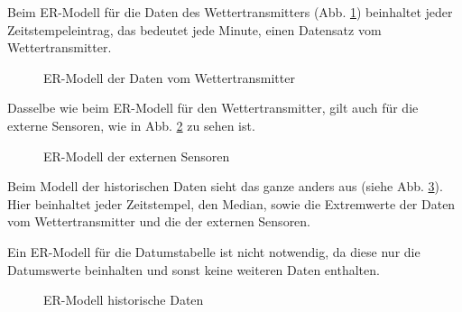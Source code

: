 Beim ER-Modell für die Daten des Wettertransmitters (Abb. \ref{img:ER_Modell Wettertransmitter}) beinhaltet jeder Zeitstempeleintrag, das bedeutet jede Minute, einen Datensatz vom Wettertransmitter.

\begin{figure}[h!]
	\centering
	\caption{ER-Modell der Daten vom Wettertransmitter}
	\label{img:ER_Modell Wettertransmitter}
\end{figure}

Dasselbe wie beim ER-Modell für den Wettertransmitter, gilt auch für die externe Sensoren, wie in Abb. \ref{img:ER_Modell externe Sensoren} zu sehen ist.
\begin{figure}[h!]
	\centering
	\caption{ER-Modell der externen Sensoren}
	\label{img:ER_Modell externe Sensoren}
\end{figure}

Beim Modell der historischen Daten sieht das ganze anders aus (siehe Abb. \ref{img:ER_Modell historische Daten}). Hier beinhaltet jeder Zeitstempel, den Median, sowie die Extremwerte der Daten vom Wettertransmitter und die der externen Sensoren.

Ein ER-Modell für die Datumstabelle ist nicht notwendig, da diese nur die Datumswerte beinhalten und sonst keine weiteren Daten enthalten.

\begin{figure}[h!]
	\centering
	\caption{ER-Modell historische Daten}
	\label{img:ER_Modell historische Daten}
\end{figure}

